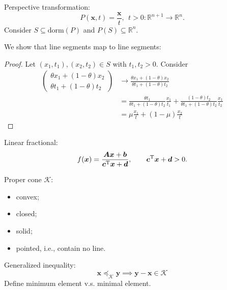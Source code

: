 Perspective transformation:
\[
P(\bm x,t) = \frac{\bm x}{t},~~t>0:
\mathbb{R}^{n+1}\to\mathbb{R}^n.
\]
Consider $S\subseteq\text{dorm}(P)$ and $P(S)\subseteq\mathbb{R}^n$.

We show that line segments map to line segments:
\begin{proof}
Let $(x_1,t_1),(x_2,t_2)\in S$ with $t_1,t_2>0$.
Consider
\begin{align*}
\begin{pmatrix}
\theta x_1 + (1-\theta)x_2\\
\theta t_1 + (1-\theta)t_2
\end{pmatrix}&
\to
\frac{\theta x_1 + (1-\theta)x_2}{\theta t_1 + (1-\theta)t_2}
\\&=
\frac{\theta t_1}{\theta t_1 + (1-\theta)t_2}\frac{x_1}{t_1}
+
\frac{(1-\theta)t_2}{\theta t_1 + (1-\theta)t_2}\frac{x_1}{t_2}\\
&=\mu\frac{x_1}{t}+(1-\mu)\frac{x_2}{t}
\end{align*}
\end{proof}


Linear fractional:
\[
f(\bm x) = \frac{\bm A\bm x+\bm b}{\bm c^{\mathrm T}\bm x+\bm d},\qquad
\bm c^{\mathrm T}\bm x+\bm d>0.
\]

Proper cone $\mathcal{K}$:
\begin{itemize}
\item
convex;
\item
closed;
\item
solid;
\item
pointed, i.e., contain no line.
\end{itemize}

Generalized inequality:
\[
\bm x\preceq_{\mathcal{K}}\bm y\implies
\bm y-\bm x\in\mathcal{K}
\]
Define minimum element v.s. minimal element.






























